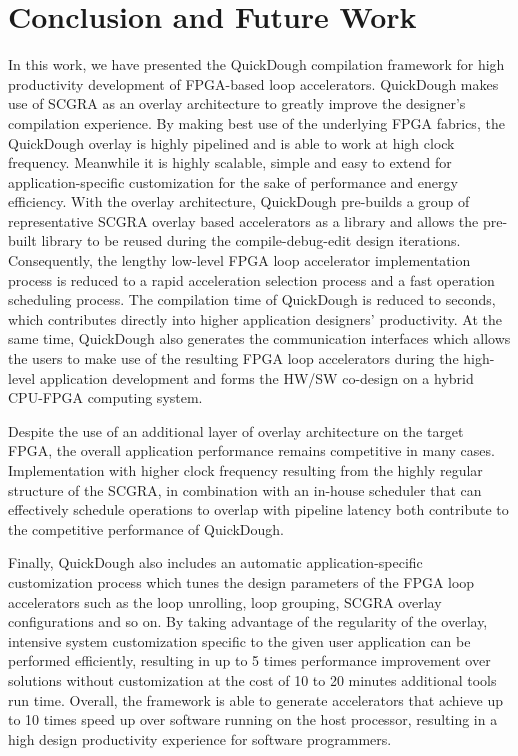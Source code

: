 \chapter{Conclusion and Future Work} \label{chapter:conclusion}
In this work, we have presented the QuickDough compilation framework for high productivity development of FPGA-based loop accelerators. QuickDough makes use of SCGRA as an overlay architecture to greatly improve the designer's compilation experience. By making best use of the underlying FPGA fabrics, the QuickDough overlay is highly pipelined and is able to work at high clock frequency. Meanwhile it is highly scalable, simple and easy to extend for application-specific customization for the sake of performance and energy efficiency. With the overlay architecture, QuickDough pre-builds a group of representative SCGRA overlay based accelerators as a library and allows the pre-built library to be reused during the compile-debug-edit design iterations. Consequently, the lengthy low-level FPGA loop accelerator implementation process is reduced to a rapid acceleration selection process and a fast operation scheduling process. The compilation time of QuickDough is reduced to seconds, which contributes directly into higher application designers' productivity. At the same time, QuickDough also generates the communication interfaces which allows the users to make use of the resulting FPGA loop accelerators during the high-level application development and forms the HW/SW co-design on a hybrid CPU-FPGA computing system. 

Despite the use of an additional layer of overlay architecture on the target FPGA, the overall application performance remains competitive in many cases. Implementation with higher clock frequency resulting from the highly regular structure of the SCGRA, in combination with an in-house scheduler that can effectively schedule operations to overlap with pipeline latency both contribute to the competitive performance of QuickDough.

Finally, QuickDough also includes an automatic application-specific customization process which tunes the design parameters of the FPGA loop accelerators such as the loop unrolling, loop grouping, SCGRA overlay configurations and so on. By taking advantage of the regularity of the overlay, intensive system customization specific to the given user application can be performed efficiently, resulting in up to \num{5} times performance improvement over solutions without customization at the cost of \num{10} to \num{20} minutes additional tools run time. Overall, the framework is able to generate accelerators that achieve up to \num{10} times speed up over software running on the host processor, resulting in a high design productivity experience for software programmers.

